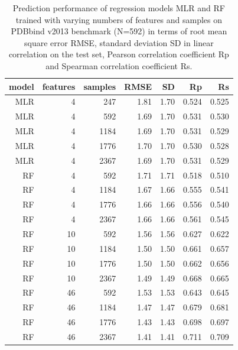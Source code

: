 \documentclass[journal=jacsat,manuscript=article]{achemso}
\begin{document}
\begin{table}
\caption{Prediction performance of regression models MLR and RF trained with varying numbers of features and samples on PDBbind v2013 benchmark (N=592) in terms of root mean square error RMSE, standard deviation SD in linear correlation on the test set, Pearson correlation coefficient Rp and Spearman correlation coefficient Rs.}
\label{tbl:tst592}
\begin{tabular}{rrrrrrr}
\hline
model & features & samples & RMSE & SD & Rp & Rs\\
\hline
MLR &  4 &  247 & 1.81 & 1.70 & 0.524 & 0.525\\
MLR &  4 &  592 & 1.69 & 1.70 & 0.531 & 0.530\\
MLR &  4 & 1184 & 1.69 & 1.70 & 0.531 & 0.529\\
MLR &  4 & 1776 & 1.70 & 1.70 & 0.530 & 0.528\\
MLR &  4 & 2367 & 1.69 & 1.70 & 0.531 & 0.529\\
 RF &  4 &  592 & 1.71 & 1.71 & 0.518 & 0.510\\
 RF &  4 & 1184 & 1.67 & 1.66 & 0.555 & 0.541\\
 RF &  4 & 1776 & 1.66 & 1.66 & 0.556 & 0.540\\
 RF &  4 & 2367 & 1.66 & 1.66 & 0.561 & 0.545\\
 RF & 10 &  592 & 1.56 & 1.56 & 0.627 & 0.622\\
 RF & 10 & 1184 & 1.50 & 1.50 & 0.661 & 0.657\\
 RF & 10 & 1776 & 1.50 & 1.50 & 0.662 & 0.656\\
 RF & 10 & 2367 & 1.49 & 1.49 & 0.668 & 0.665\\
 RF & 46 &  592 & 1.53 & 1.53 & 0.643 & 0.645\\
 RF & 46 & 1184 & 1.47 & 1.47 & 0.679 & 0.681\\
 RF & 46 & 1776 & 1.43 & 1.43 & 0.698 & 0.697\\
 RF & 46 & 2367 & 1.41 & 1.41 & 0.711 & 0.709\\
\hline
\end{tabular}
\end{table}
\end{document}
